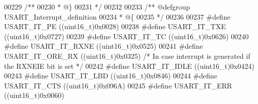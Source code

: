 \begin{DoxyCode}
00229 \textcolor{comment}{/**}
00230 \textcolor{comment}{  * @\}}
00231 \textcolor{comment}{  */}
00232 
00233 \textcolor{comment}{/** @defgroup USART\_Interrupt\_definition }
00234 \textcolor{comment}{  * @\{}
00235 \textcolor{comment}{  */}
00236 
00237 \textcolor{preprocessor}{#}\textcolor{preprocessor}{define} \textcolor{preprocessor}{USART\_IT\_PE}                          \textcolor{preprocessor}{(}\textcolor{preprocessor}{(}\textcolor{preprocessor}{uint16\_t}\textcolor{preprocessor}{)}0x0028\textcolor{preprocessor}{)}
00238 \textcolor{preprocessor}{#}\textcolor{preprocessor}{define} \textcolor{preprocessor}{USART\_IT\_TXE}                         \textcolor{preprocessor}{(}\textcolor{preprocessor}{(}\textcolor{preprocessor}{uint16\_t}\textcolor{preprocessor}{)}0x0727\textcolor{preprocessor}{)}
00239 \textcolor{preprocessor}{#}\textcolor{preprocessor}{define} \textcolor{preprocessor}{USART\_IT\_TC}                          \textcolor{preprocessor}{(}\textcolor{preprocessor}{(}\textcolor{preprocessor}{uint16\_t}\textcolor{preprocessor}{)}0x0626\textcolor{preprocessor}{)}
00240 \textcolor{preprocessor}{#}\textcolor{preprocessor}{define} \textcolor{preprocessor}{USART\_IT\_RXNE}                        \textcolor{preprocessor}{(}\textcolor{preprocessor}{(}\textcolor{preprocessor}{uint16\_t}\textcolor{preprocessor}{)}0x0525\textcolor{preprocessor}{)}
00241 \textcolor{preprocessor}{#}\textcolor{preprocessor}{define} \textcolor{preprocessor}{USART\_IT\_ORE\_RX}                      \textcolor{preprocessor}{(}\textcolor{preprocessor}{(}\textcolor{preprocessor}{uint16\_t}\textcolor{preprocessor}{)}0x0325\textcolor{preprocessor}{)} \textcolor{comment}{/* In case interrupt is generated if
       the RXNEIE bit is set */}
00242 \textcolor{preprocessor}{#}\textcolor{preprocessor}{define} \textcolor{preprocessor}{USART\_IT\_IDLE}                        \textcolor{preprocessor}{(}\textcolor{preprocessor}{(}\textcolor{preprocessor}{uint16\_t}\textcolor{preprocessor}{)}0x0424\textcolor{preprocessor}{)}
00243 \textcolor{preprocessor}{#}\textcolor{preprocessor}{define} \textcolor{preprocessor}{USART\_IT\_LBD}                         \textcolor{preprocessor}{(}\textcolor{preprocessor}{(}\textcolor{preprocessor}{uint16\_t}\textcolor{preprocessor}{)}0x0846\textcolor{preprocessor}{)}
00244 \textcolor{preprocessor}{#}\textcolor{preprocessor}{define} \textcolor{preprocessor}{USART\_IT\_CTS}                         \textcolor{preprocessor}{(}\textcolor{preprocessor}{(}\textcolor{preprocessor}{uint16\_t}\textcolor{preprocessor}{)}0x096A\textcolor{preprocessor}{)}
00245 \textcolor{preprocessor}{#}\textcolor{preprocessor}{define} \textcolor{preprocessor}{USART\_IT\_ERR}                         \textcolor{preprocessor}{(}\textcolor{preprocessor}{(}\textcolor{preprocessor}{uint16\_t}\textcolor{preprocessor}{)}0x0060\textcolor{preprocessor}{)}

\end{DoxyCode}
